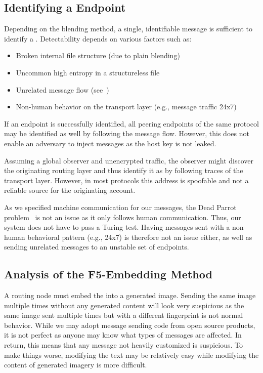 \subsection{Identifying a \VortexMessage{} Endpoint}
Depending on the blending method, a single, identifiable message is sufficient to identify a \VortexNode. Detectability depends on various factors such as:

\begin{itemize}
	\item Broken internal file structure (due to plain blending)
	\item Uncommon high entropy in a structureless file
	\item Unrelated message flow (see~\cite{oakland2013-parrot})
	\item Non-human behavior on the transport layer (e.g., message traffic 24x7)
\end{itemize}

If an endpoint is successfully identified, all peering endpoints of the same protocol may be identified as well by following the message flow. However, this does not enable an adversary to inject messages as the host key is not leaked. 

Assuming a global observer and unencrypted traffic, the observer might discover the originating routing layer and thus identify it as \VortexNode{} by following traces of the transport layer. However, in most protocols this address is spoofable and not a reliable source for the originating account.

As we specified machine communication for our messages, the Dead Parrot problem~\cite{oakland2013-parrot} is not an issue as it only follows human communication. Thus, our system does not have to pass a Turing test. Having messages sent with a non-human behavioral pattern (e.g., 24x7) is therefore not an issue either, as well as sending unrelated messages to an unstable set of endpoints. 

\subsection{Analysis of the F5-Embedding Method}
A routing node must embed the \VortexMessage{} into a generated image. Sending the same image multiple times without any generated content will look very suspicious as the same image sent multiple times but with a different fingerprint is not normal behavior. While we may adopt message sending code from open source products, it is not perfect as anyone may know what types of messages are affected. In return, this means that any message not heavily customized is suspicious. To make things worse, modifying the text may be relatively easy while modifying the content of generated imagery is more difficult.

